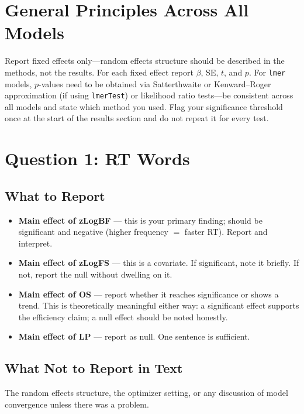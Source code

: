 \documentclass[12pt]{article}
\begin{document}
	\section*{General Principles Across All Models}
	
	Report fixed effects only---random effects structure should be described in the methods, not the results. For each fixed effect report $\beta$, SE, $t$, and $p$. For \texttt{lmer} models, $p$-values need to be obtained via Satterthwaite or Kenward--Roger approximation (if using \texttt{lmerTest}) or likelihood ratio tests---be consistent across all models and state which method you used. Flag your significance threshold once at the start of the results section and do not repeat it for every test.
	
	\section*{Question 1: RT Words}
	
	\subsection*{What to Report}
	
	\begin{itemize}
		\item \textbf{Main effect of zLogBF} --- this is your primary finding; should be significant and negative (higher frequency $=$ faster RT). Report and interpret.
		\item \textbf{Main effect of zLogFS} --- this is a covariate. If significant, note it briefly. If not, report the null without dwelling on it.
		\item \textbf{Main effect of OS} --- report whether it reaches significance or shows a trend. This is theoretically meaningful either way: a significant effect supports the efficiency claim; a null effect should be noted honestly.
		\item \textbf{Main effect of LP} --- report as null. One sentence is sufficient.
	\end{itemize}
	
	\subsection*{What Not to Report in Text}
	
	The random effects structure, the optimizer setting, or any discussion of model convergence unless there was a problem.
	
\end{document}
